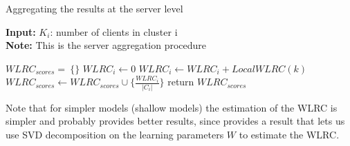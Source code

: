 \documentclass{article}
\begin{document}
\begin{algorithm}[H]
\caption{Aggregating the results at the server level}
\label{alg:fedalrc}
\textbf{Input:} $K_i$: number of clients in cluster i\\
\textbf{Note:} This is the server aggregation procedure

\begin{algorithmic}[1]
\STATE $WLRC_{scores}=\ \{\}$
    \STATE $WLRC_i \gets 0$
        \STATE $WLRC_i \gets WLRC_i + LocalWLRC(k)$
    \ENDFOR
    $WLRC_{scores} \gets WLRC_{scores} \cup \{\frac{WLRC_i}{|C_i|}\}$
\ENDFOR
\STATE return $WLRC_{scores}$
\end{algorithmic}
\end{algorithm}
Note that for simpler models (shallow models) the estimation of the WLRC is simpler and probably provides better results, since \cite{WLRC} provides a result that lets us use SVD decomposition on the learning parameters $W$ to estimate the WLRC.



\end{document}

